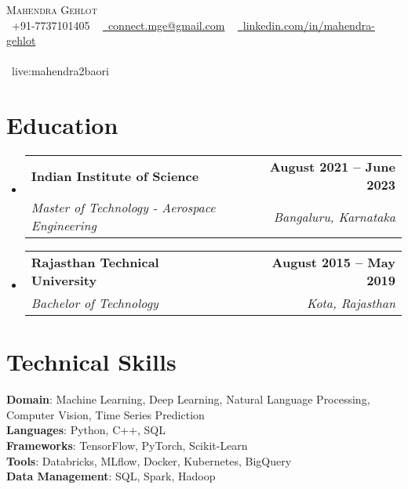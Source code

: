 \documentclass[letterpaper,11pt]{article}
\makeatletter
\newcommand{\resumeSubheading}[4]{
  \vspace{-2pt}\item
    \begin{tabular*}{1.0\textwidth}[t]{l@{\extracolsep{\fill}}r}
      \textbf{#1} & \textbf{\small #2} \\
      \textit{\small#3} & \textit{\small #4} \\
    \end{tabular*}\vspace{-7pt}
}
\newcommand{\resumeSubHeadingListStart}{\begin{itemize}[leftmargin=0.0in, label={}]}
\newcommand{\resumeSubHeadingListEnd}{\end{itemize}}
\makeatother
\begin{document}

\begin{center}
    {\Huge \scshape Mahendra Gehlot} \\ \vspace{8pt}
    \small \raisebox{-0.1\height}\faPhone\ +91-7737101405 ~ 
    \href{mailto:connect.mge@gmail.com}{\raisebox{-0.2\height}\faEnvelope\ {connect.mge@gmail.com}} ~
    \href{https://www.linkedin.com/in/mahendra-gehlot}{\raisebox{-0.2\height}\faLinkedin\ {linkedin.com/in/mahendra-gehlot}}  ~ 
    \vspace{4pt}
    \\\\{\faSkype\ {live:mahendra2baori}} ~
    \href{https://github.com/mahendra-gehlot}{\raisebox{-0.2\height}}  ~ 
    \vspace{-12pt}
\end{center}

\section{Education}
  \resumeSubHeadingListStart
    \resumeSubheading
      {Indian Institute of Science}{August 2021 -- June 2023}
      {Master of Technology - Aerospace Engineering}{Bangaluru, Karnataka}
    \resumeSubHeadingListEnd
    \resumeSubHeadingListStart
    \resumeSubheading
      {Rajasthan Technical University}{August 2015 -- May 2019}
      {Bachelor of Technology}{Kota, Rajasthan}
    \resumeSubHeadingListEnd

\section{Technical Skills}
 \begin{itemize}[leftmargin=0.15in, label={}]
    \small{\item{
    \textbf{Domain}{: Machine Learning, Deep Learning, Natural Language Processing, Computer Vision, Time Series Prediction} \\
    \vspace{4pt}
     \textbf{Languages}{: Python, C++, SQL} \\
     \vspace{4pt}
     \textbf{Frameworks}{: TensorFlow, PyTorch, Scikit-Learn} \\
     \vspace{4pt}
     \textbf{Tools}{: Databricks, MLflow, Docker, Kubernetes, BigQuery} \\
     \vspace{4pt}
     \textbf{Data Management}{: SQL, Spark, Hadoop} \\
    }}
 \end{itemize}
\end{document}

